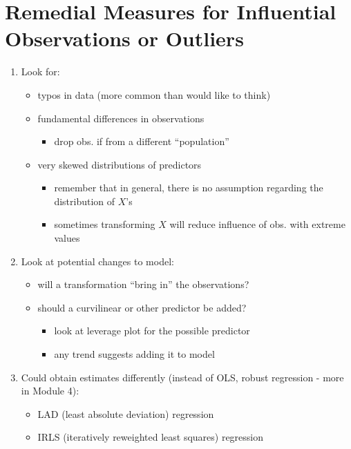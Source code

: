 \documentclass[12pt]{notes}
\begin{document}
\section{Remedial Measures for Influential Observations or Outliers}

\begin{enumerate}
 \item Look for:
    \begin{itemize}
       \item  typos in data (more common than would like to think)
       \item fundamental differences in observations
          \begin{itemize}
            \item drop obs. if from a different ``population''
          \end{itemize}
       \item very skewed distributions of predictors
         \begin{itemize}
             \item remember that in general, there is no assumption regarding the distribution of $X$'s
             \item sometimes transforming $X$ will reduce influence of obs. with extreme values
         \end{itemize}
    \end{itemize}

 \item Look at potential changes to model:
  \begin{itemize}
    \item will a transformation ``bring in'' the observations?
    \item should a curvilinear or other predictor be added?
       \begin{itemize}
         \item look at leverage plot for the possible predictor
         \item any trend suggests adding it to model
       \end{itemize}
  \end{itemize}

 \item Could obtain estimates differently (instead of OLS, robust regression - more in Module 4):
     \begin{itemize}
        \item LAD (least absolute deviation) regression
        \item IRLS (iteratively reweighted least squares) regression
     \end{itemize}
\end{enumerate}








\end{document}
